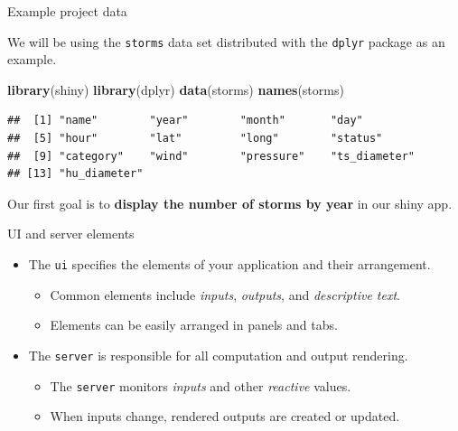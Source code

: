 \documentclass[
  12pt,
  ignorenonframetext,
]{beamer}
\newenvironment{Shaded}{\begin{snugshade}}{\end{snugshade}}
\newcommand{\KeywordTok}[1]{\textcolor[rgb]{0.13,0.29,0.53}{\textbf{#1}}}
\newcommand{\NormalTok}[1]{#1}
\providecommand{\tightlist}{%
  \setlength{\itemsep}{0pt}\setlength{\parskip}{0pt}}
\begin{document}
\begin{frame}[fragile]{Example project data}
\protect\hypertarget{example-project-data}{}

We will be using the \texttt{storms} data set distributed with the
\texttt{dplyr} package as an example.

\begin{Shaded}
\begin{Highlighting}[]
\KeywordTok{library}\NormalTok{(shiny)}
\KeywordTok{library}\NormalTok{(dplyr)}
\KeywordTok{data}\NormalTok{(storms)}
\KeywordTok{names}\NormalTok{(storms)}
\end{Highlighting}
\end{Shaded}

\begin{verbatim}
##  [1] "name"        "year"        "month"       "day"        
##  [5] "hour"        "lat"         "long"        "status"     
##  [9] "category"    "wind"        "pressure"    "ts_diameter"
## [13] "hu_diameter"
\end{verbatim}

Our first goal is to \textbf{display the number of storms by year} in
our shiny app.

\end{frame}

\begin{frame}[fragile]{UI and server elements}
\protect\hypertarget{ui-and-server-elements}{}

\begin{itemize}
\tightlist
\item
  The \texttt{ui} specifies the elements of your application and their
  arrangement.

  \begin{itemize}
  \tightlist
  \item
    Common elements include \emph{inputs}, \emph{outputs}, and
    \emph{descriptive text}.
  \item
    Elements can be easily arranged in panels and tabs.
  \end{itemize}
\item
  The \texttt{server} is responsible for all computation and output
  rendering.

  \begin{itemize}
  \tightlist
  \item
    The \texttt{server} monitors \emph{inputs} and other \emph{reactive}
    values.
  \item
    When inputs change, rendered outputs are created or updated.
  \end{itemize}
\end{itemize}

\end{frame}
\end{document}

